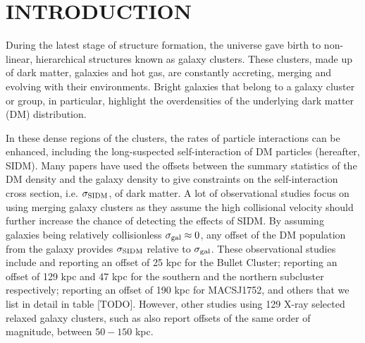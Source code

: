 
\section{INTRODUCTION} 
During the latest stage of structure formation, the universe gave birth to
non-linear, hierarchical structures known as galaxy clusters. 
These clusters, made up of dark matter, galaxies and hot gas,
are constantly accreting, merging and evolving with their
environments. Bright galaxies that belong to a galaxy cluster or group, in 
particular, highlight the overdensities of the underlying dark matter (DM) 
distribution. 


In these dense regions of the clusters, the rates of particle
interactions can be enhanced, including the long-suspected self-interaction of DM
particles (hereafter, SIDM).  
Many papers have used the offsets between the summary statistics of the DM
density and the galaxy density to give constraints on 
the self-interaction cross
section, i.e. $\sigma_{\rm SIDM}$, of dark matter. 
A lot of observational studies focus on using merging galaxy clusters
as they assume the high collisional velocity should further increase the chance
of detecting the effects of SIDM.
By assuming galaxies being relatively collisionless $\sigma_{\rm gal} \approx 0$, 
any offset of the DM population from the galaxy provides $\sigma_{\rm SIDM}$ 
relative to $\sigma_{\rm gal}$. 
These observational studies include \cite{Markevitch2004} and \cite{Bradac2006b}  
reporting an offset of 25 kpc for the Bullet Cluster;  
\cite{Dawson2013} reporting an offset of 129 kpc and 47 kpc for the southern
and the northern subcluster respectively;
\cite{Jee2015} reporting an offset of 190 kpc for MACSJ1752, and others that we
list in detail in table [TODO].
However, other studies using 129 X-ray selected relaxed galaxy clusters, 
such as \cite{George2012a} also report offsets of the same order of magnitude,
between $50 - 150$ kpc. 

